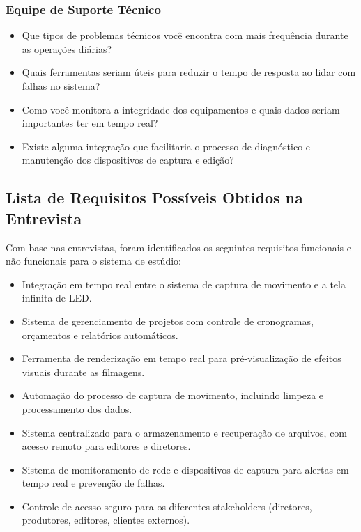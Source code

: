 \subsubsection{Equipe de Suporte Técnico}

\begin{itemize}
  \item Que tipos de problemas técnicos você encontra com mais frequência durante as operações diárias?
  \item Quais ferramentas seriam úteis para reduzir o tempo de resposta ao lidar com falhas no sistema?
  \item Como você monitora a integridade dos equipamentos e quais dados seriam importantes ter em tempo real?
  \item Existe alguma integração que facilitaria o processo de diagnóstico e manutenção dos dispositivos de captura e edição?
\end{itemize}

\subsection{Lista de Requisitos Possíveis Obtidos na Entrevista}

Com base nas entrevistas, foram identificados os seguintes requisitos funcionais e não funcionais para o sistema de estúdio:

\begin{itemize}
  \item Integração em tempo real entre o sistema de captura de movimento e a tela infinita de LED.
  \item Sistema de gerenciamento de projetos com controle de cronogramas, orçamentos e relatórios automáticos.
  \item Ferramenta de renderização em tempo real para pré-visualização de efeitos visuais durante as filmagens.
  \item Automação do processo de captura de movimento, incluindo limpeza e processamento dos dados.
  \item Sistema centralizado para o armazenamento e recuperação de arquivos, com acesso remoto para editores e diretores.
  \item Sistema de monitoramento de rede e dispositivos de captura para alertas em tempo real e prevenção de falhas.
  \item Controle de acesso seguro para os diferentes stakeholders (diretores, produtores, editores, clientes externos).
\end{itemize}

